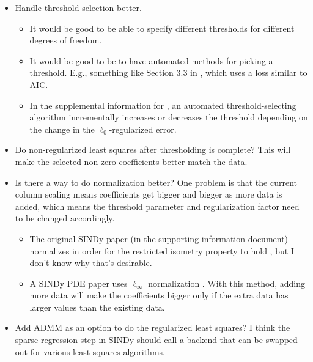\documentclass{article}
\begin{document}
\begin{itemize}
    \item Handle threshold selection better.
    \begin{itemize}
        \item It would be good to be able to specify different thresholds for
          different degrees of freedom.
        \item It would be good to be to have automated methods for picking a
          threshold. E.g., something like Section 3.3 in
          \cite{shea2020sindy-bvp}, which uses a loss similar to AIC.
        \item In the supplemental information for \cite{rudy2017sindy-pde}, an
          automated threshold-selecting algorithm incrementally increases or
          decreases the threshold depending on the change in the
          $\ell_0$-regularized error.
    \end{itemize}

    \item Do non-regularized least squares after thresholding is complete? This
      will make the selected non-zero coefficients better match the data.

    \item Is there a way to do normalization better? One problem is that the
      current column scaling means coefficients get bigger and bigger as more
      data is added, which means the threshold parameter and regularization
      factor need to be changed accordingly. 
    \begin{itemize}
        \item The original SINDy paper (in the supporting information document)
          normalizes in order for the restricted isometry property to hold
          \cite{brunton2016sindy}, but I don't know why that's desirable.
        \item A SINDy PDE paper uses $\ell_\infty$ normalization
          \cite{schaeffer2017sindy-pde2}. With this method, adding more data
          will make the coefficients bigger only if the extra data has larger
          values than the existing data.
    \end{itemize}

    \item Add ADMM as an option to do the regularized least squares? I think the
      sparse regression step in SINDy should call a backend that can be swapped
      out for various least squares algorithms.
\end{itemize}
\end{document}
